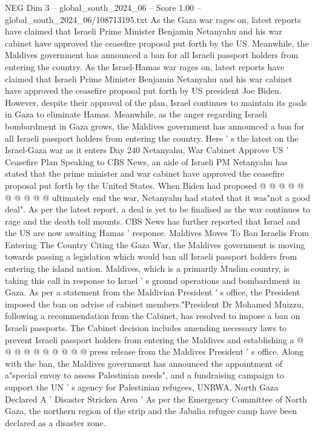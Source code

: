\begin{textsample}{NEG Dim 3 – global\_south\_2024\_06 – Score 1.00 – global\_south\_2024\_06/108713195.txt}  \label{ex:f3_neg_117}
As the Gaza war rages on, latest reports have claimed that Israeli Prime Minister Benjamin Netanyahu and his war cabinet have approved the ceasefire proposal put forth by the US.
Meanwhile, the Maldives government has announced a ban for all Israeli passport holders from entering the country.
As the Israel-Hamas war rages on, latest reports have claimed that Israeli Prime Minister Benjamin Netanyahu and his war cabinet have approved the ceasefire proposal put forth by US president Joe Biden.
However, despite their approval of the plan, Israel continues to maintain its goals in Gaza to eliminate Hamas.
Meanwhile, as the anger regarding Israeli bombardment in Gaza grows, the Maldives government has announced a ban for all Israeli passport holders from entering the country.
Here ' s the latest on the Israel-Gaza war as it enters Day 240 Netanyahu, War Cabinet Approve US ' Ceasefire Plan Speaking to CBS News, an aide of Israeli PM Netanyahu has stated that the prime minister and war cabinet have approved the ceasefire proposal put forth by the United States.
When Biden had proposed @ @ @ @ @ @ @ @ @ @ ultimately end the war, Netanyahu had stated that it was"not a good deal".
As per the latest report, a deal is yet to be finalised as the war continues to rage and the death toll mounts.
CBS News has further reported that Israel and the US are now awaiting Hamas ' response.
Maldives Moves To Ban Israelis From Entering The Country Citing the Gaza War, the Maldives government is moving towards passing a legislation which would ban all Israeli passport holders from entering the island nation.
Maldives, which is a primarily Muslim country, is taking this call in response to Israel ' s ground operations and bombardment in Gaza.
As per a statement from the Maldivian President ' s office, the President imposed the ban on advise of cabinet members."President Dr Mohamed Muizzu, following a recommendation from the Cabinet, has resolved to impose a ban on Israeli passports.
The Cabinet decision includes amending necessary laws to prevent Israeli passport holders from entering the Maldives and establishing a @ @ @ @ @ @ @ @ @ @ press release from the Maldives President ' s office.
Along with the ban, the Maldives government has announced the appointment of a"special envoy to assess Palestinian needs", and a fundraising campaign to support the UN ' s agency for Palestinian refugees, UNRWA.
North Gaza Declared A ' Disaster Stricken Area ' As per the Emergency Committee of North Gaza, the northern region of the strip and the Jabalia refugee camp have been declared as a disaster zone.

\end{textsample}
